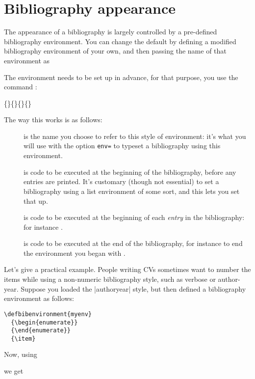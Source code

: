 \section{Bibliography appearance}

The appearance of a bibliography is largely controlled by a
pre-defined bibliography environment. You can change the default by
defining a modified bibliography environment of your own, and then
passing the name of that environment as
\begin{center}
\end{center}

The environment needs to be set up in advance, for that purpose, you
use the command :
\begin{pseudoverb}
\{\}\{\}\{\}\{\}
\end{pseudoverb}
The way this works is as follows:
\begin{description}
\item[] is the name you choose to refer to this style of
  environment: it's what you will use with the option \texttt{env=} to
  typeset a bibliography using this environment.
\item[] is code to be executed at the beginning of the
  bibliography, before any entries are printed. It's customary (though
  not essential) to set a bibliography using a list environment of
  some sort, and this lets you set that up.
\item[] is code to be executed at the beginning of each
  \emph{entry} in the bibliography: for instance .
\item[] is code to be executed at the end of the
  bibliography, for instance to end the environment you began with
  .
\end{description}

Let's give a practical example. People writing CVs sometimes want to
number the items while using a non-numeric bibliography style, such as
verbose or author-year. Suppose you loaded the |authoryear| style, but
then defined a bibliography environment as follows:
\begin{verbatim}
\defbibenvironment{myenv}
  {\begin{enumerate}}
  {\end{enumerate}}
  {\item}
\end{verbatim}
Now, using
\begin{pseudoverb}
\relax[env=myenv,heading=myheading]
\end{pseudoverb}
we get

